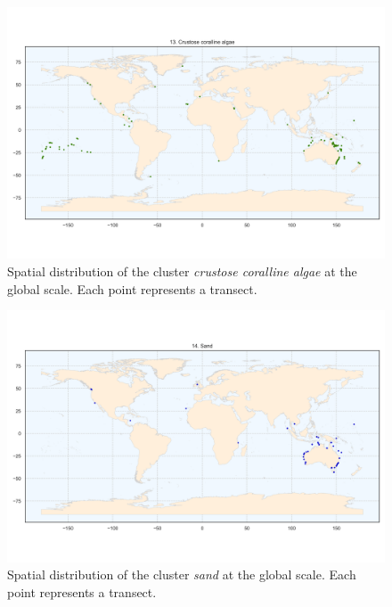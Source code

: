 \begin{figure}
\hypertarget{fig:chap2figS15}{%
\centering
\includegraphics{03-Chapitre2/figures/supplementary/06-spatial-cluster_distribution_cluster_12.png}
\caption{Spatial distribution of the cluster \emph{crustose coralline
algae} at the global scale. Each point represents a
transect.}\label{fig:chap2figS15}
}
\end{figure}

\begin{figure}
\hypertarget{fig:chap2figS16}{%
\centering
\includegraphics{03-Chapitre2/figures/supplementary/06-spatial-cluster_distribution_cluster_13.png}
\caption{Spatial distribution of the cluster \emph{sand} at the global
scale. Each point represents a transect.}\label{fig:chap2figS16}
}
\end{figure}

